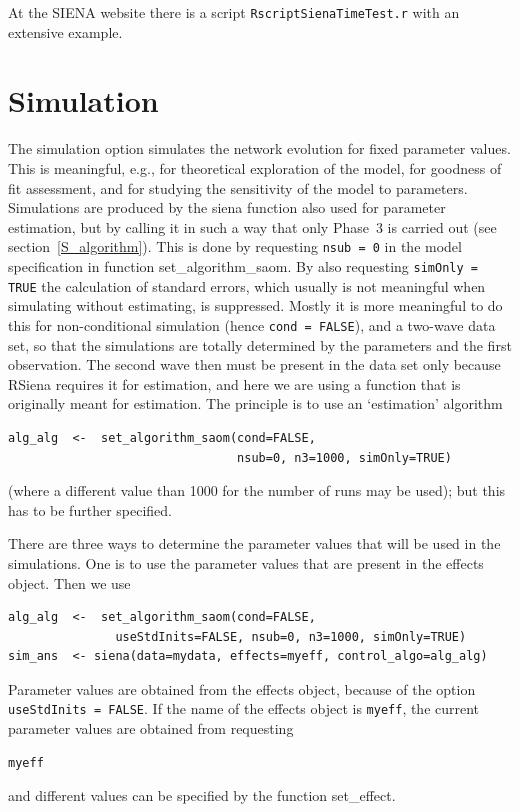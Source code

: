 \documentclass[a4paper,fleqn,11pt]{article}
\newcommand{\+}{\, + \,}
\newcommand{\sfn}[1]{\textsf{#1}}
\newcommand{\RS}{{\sf \textsf{RSiena} }}
\newcommand{\SI}{{\sf SIENA }}
\begin{document}
At the \SI website there is a script \texttt{RscriptSienaTimeTest.r}
with an extensive example.

\newpage
\section{Simulation}
\label{S_sim}

The simulation option simulates the network evolution for fixed
parameter values. This is meaningful, e.g., for theoretical
exploration of the model, for goodness of fit assessment,
and for studying the sensitivity of the model to parameters.
Simulations are produced by the \textsf{siena} function
also used for parameter estimation, but by calling it in
such a way that only Phase~3 is carried out
(see section~\ref{S_algorithm}).
This is done by requesting \texttt{nsub = 0} in
the model specification in function \textsf{set\_algorithm\_saom}.
By also requesting \texttt{simOnly = TRUE} the calculation
of standard errors, which usually is not meaningful when
simulating without estimating, is suppressed.
Mostly it is more meaningful to do this for non-conditional simulation
(hence \texttt{cond = FALSE}), and a two-wave data set,
so that the simulations are totally determined
by the parameters and the first observation.
The second wave then must be present in the data set only
because \RS requires it for estimation,
and here we are using a function that is originally
meant for estimation.
The principle is to use an `estimation' algorithm
\begin{verbatim}
alg_alg  <-  set_algorithm_saom(cond=FALSE,
                                nsub=0, n3=1000, simOnly=TRUE)
\end{verbatim}
(where a different value than 1000 for the number of runs may be used);
but this has to be further specified.

There are three ways to determine the parameter values that will be
used in the simulations. One is to use the parameter values that are
present in the effects object. Then we use
\begin{verbatim}
alg_alg  <-  set_algorithm_saom(cond=FALSE,
               useStdInits=FALSE, nsub=0, n3=1000, simOnly=TRUE)
sim_ans  <- siena(data=mydata, effects=myeff, control_algo=alg_alg)
\end{verbatim}
Parameter values are obtained from the effects object,
because of the option \texttt{useStdInits = FALSE}.
If the name of the effects object is \texttt{myeff},
the current parameter values are obtained from requesting
\begin{verbatim}
myeff
\end{verbatim}
and different values can be specified by the function \sfn{set\_effect}.
\end{document}
